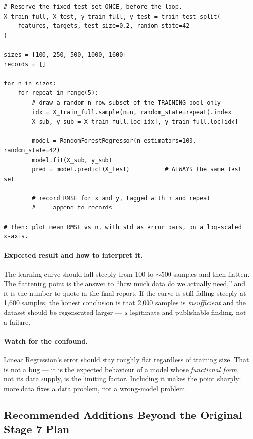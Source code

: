 \documentclass[11pt,a4paper]{article}
\begin{document}
\begin{lstlisting}[caption={Stage 7 --- learning-curve experiment skeleton.}]
# Reserve the fixed test set ONCE, before the loop.
X_train_full, X_test, y_train_full, y_test = train_test_split(
    features, targets, test_size=0.2, random_state=42
)

sizes = [100, 250, 500, 1000, 1600]
records = []

for n in sizes:
    for repeat in range(5):
        # draw a random n-row subset of the TRAINING pool only
        idx = X_train_full.sample(n=n, random_state=repeat).index
        X_sub, y_sub = X_train_full.loc[idx], y_train_full.loc[idx]

        model = RandomForestRegressor(n_estimators=100, random_state=42)
        model.fit(X_sub, y_sub)
        pred = model.predict(X_test)          # ALWAYS the same test set

        # record RMSE for x and y, tagged with n and repeat
        # ... append to records ...

# Then: plot mean RMSE vs n, with std as error bars, on a log-scaled x-axis.
\end{lstlisting}

\paragraph{Expected result and how to interpret it.}
The learning curve should fall steeply from 100 to ${\sim}500$ samples and then flatten. The
flattening point is the answer to ``how much data do we actually need,'' and it is the number to
quote in the final report. If the curve is still falling steeply at 1{,}600 samples, the honest
conclusion is that 2{,}000 samples is \emph{insufficient} and the dataset should be regenerated
larger --- a legitimate and publishable finding, not a failure.

\paragraph{Watch for the confound.}
Linear Regression's error should stay roughly flat regardless of training size. That is not a bug ---
it is the expected behaviour of a model whose \emph{functional form}, not its data supply, is the
limiting factor. Including it makes the point sharply: more data fixes a data problem, not a
wrong-model problem.

\subsection{Recommended Additions Beyond the Original Stage 7 Plan}
\end{document}
